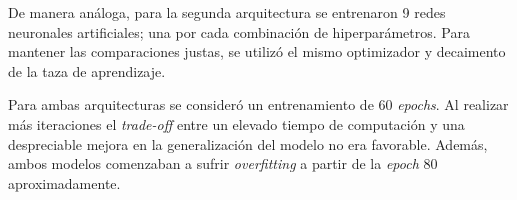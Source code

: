 De manera análoga, para la segunda arquitectura se entrenaron 9 redes neuronales artificiales; una por cada combinación de hiperparámetros. Para mantener las comparaciones justas, se utilizó el mismo optimizador y decaimento de la taza de aprendizaje.

Para ambas arquitecturas se consideró un entrenamiento de 60 \textit{epochs}. Al realizar más iteraciones el \textit{trade-off} entre un elevado tiempo de computación y una despreciable mejora en la generalización del modelo no era favorable. Además, ambos modelos comenzaban a sufrir \textit{overfitting} a partir de la \textit{epoch} 80 aproximadamente.

